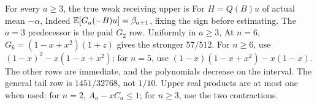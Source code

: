 For every \(a\ge3\), the true weak receiving upper is
For \(H=Q(B)u\) of actual mean \(-\alpha\),
Indeed \(\mathbb E[G_a(-B)u]=\beta_{a+1}\), fixing the sign before estimating.
The \(a=3\) predecessor is the paid \(G_2\) row. Uniformly in \(a\ge3\),
At \(n=6\), \(G_6=(1-x+x^2)(1+z)\) gives the stronger \(57/512\).
For \(n\ge6\), use \((1-x)^2-x(1-x+x^2)\); for \(n=5\), use
\((1-x)(1-x+x^2)-x(1-x)\). The other rows are immediate, and the
polynomials decrease on the interval. The general tail row is
\(1451/32768\), not \(1/10\). Upper real products are at most one when
used: for \(n=2\), \(A_a-xC_a\le1\); for \(n\ge3\), use the two
contractions.

